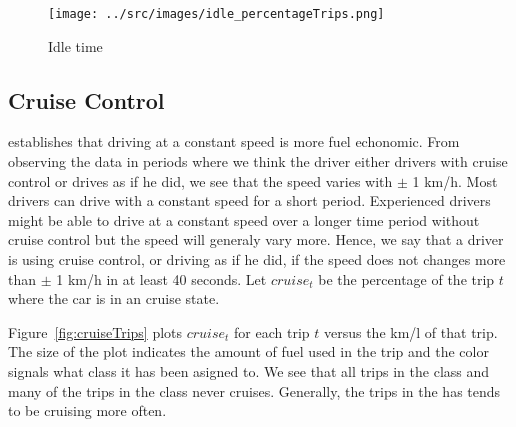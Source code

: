 \begin{figure}[htb]
\centering
\texttt{[image: ../src/images/idle\_percentageTrips.png]}
\caption{Idle time}
\label{fig:idleTrips}
\end{figure}

\subsection{Cruise Control}

\cite{EcoMark} establishes that driving at a constant speed is more fuel echonomic. 
From observing the data in periods where we think the driver either drivers with cruise control or drives as if he did, we see that the speed varies with $\pm$ 1 km/h.
Most drivers can drive with a constant speed for a short period. 
Experienced drivers might be able to drive at a constant speed over a longer time period without cruise control but the speed will generaly vary more. 
Hence, we say that a driver is using cruise control, or driving as if he did, if the speed does not changes more than $\pm$ 1 km/h in at least 40 seconds. %
Let $cruise_t$ be the percentage of the trip $t$ where the car is in an cruise state.

Figure~\ref{fig:cruiseTrips} plots $cruise_t$ for each trip $t$ versus the km/l of that trip.
The size of the plot indicates the amount of fuel used in the trip and the color signals what class it has been asigned to. 
We see that all trips in the \fuelLow class and many of the trips in the \fuelMedium class never cruises.
Generally, the trips in the \fuelHigh has tends to be cruising more often.


